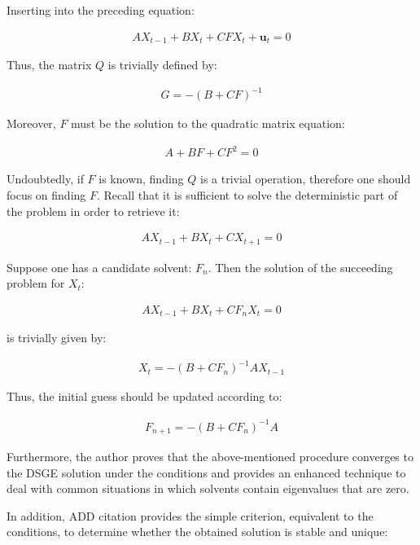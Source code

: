 \documentclass{pracamgr}
\numberwithin{equation}{section}
\begin{document}
Inserting into the preceding equation:

\begin{align}
AX_{t-1} + BX_{t} + CFX_{t} + \mathbf{u}_{t} = 0
\end{align}

Thus, the matrix $Q$ is trivially defined by:

\begin{align}
G = -\left( B + CF \right)^{-1}
\end{align}

Moreover, $F$ must be the solution to the quadratic matrix equation:

\begin{align}
A + BF + CF^{2} = 0
\end{align}

Undoubtedly, if $F$ is known, finding $Q$ is a trivial operation, therefore one should focus on finding $F$. Recall that it is sufficient to solve the deterministic part of the problem in order to retrieve it:

\begin{align}
AX_{t-1} + BX_{t} + CX_{t+1}  = 0
\end{align}

Suppose one has a candidate solvent: $F_{n}$. Then the solution of the succeeding problem for $X_{t}$:

\begin{align}
AX_{t-1} + BX_{t} + CF_{n}X_{t}  = 0
\end{align}

is trivially given by:

\begin{align}
X_{t} = -\left( B + CF_{n} \right)^{-1} AX_{t-1}
\end{align}

Thus, the initial guess should be updated according to:

\begin{align}
F_{n+1} = -\left( B + CF_{n} \right)^{-1} A
\end{align}

Furthermore, the author proves that the above-mentioned procedure converges to the DSGE solution under the \citet{blanchard1980solution} conditions and provides an enhanced technique to deal with common situations in which solvents contain eigenvalues that are zero.

In addition, {\color{red} ADD citation} provides the simple criterion, equivalent to the  \citet{blanchard1980solution} conditions, to determine whether the obtained solution is stable and unique:
\end{document}
